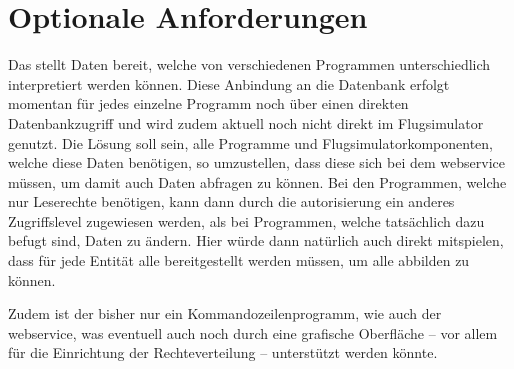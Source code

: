 \section{Optionale Anforderungen}\label{sec:optionale-anforderungen}
	Das \lfidSystem{} stellt Daten bereit,
	welche von verschiedenen Programmen unterschiedlich interpretiert werden können.
	Diese Anbindung an die Datenbank erfolgt momentan
	für jedes einzelne Programm noch über einen direkten Datenbankzugriff
	und wird zudem aktuell noch nicht direkt im Flugsimulator genutzt.
	Die Lösung soll sein,
	alle Programme und Flugsimulatorkomponenten,
	welche diese Daten benötigen,
	so umzustellen,
	dass diese sich bei dem \gls{webservice}  müssen,
	um damit auch Daten abfragen zu können.
	Bei den Programmen,
	welche nur Leserechte benötigen,
	kann dann durch die \gls{autorisierung} ein anderes Zugriffslevel zugewiesen werden,
	als bei Programmen,
	welche tatsächlich dazu befugt sind,
	Daten zu ändern.
	Hier würde dann natürlich auch direkt mitspielen,
	dass für jede Entität alle \httpMethoden{} bereitgestellt werden müssen,
	um alle \crudOperationen{} abbilden zu können.

	Zudem ist der  bisher nur ein Kommandozeilenprogramm,
	wie auch der \gls{webservice},
	was eventuell auch noch durch eine grafische Oberfläche
	-- vor allem für die Einrichtung der Rechteverteilung --
	unterstützt werden könnte.